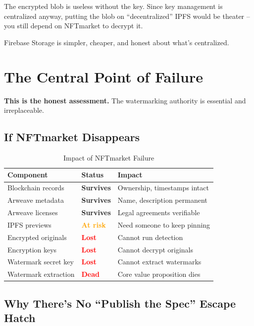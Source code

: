 \documentclass[11pt,a4paper]{article}
\begin{document}
The encrypted blob is useless without the key. Since key management is centralized anyway, putting the blob on ``decentralized'' IPFS would be theater -- you still depend on NFTmarket to decrypt it.

Firebase Storage is simpler, cheaper, and honest about what's centralized.

\newpage
\section{The Central Point of Failure}

\textbf{This is the honest assessment.} The watermarking authority is essential and irreplaceable.

\subsection{If NFTmarket Disappears}

\begin{table}[h]
\centering
\begin{tabular}{@{}L{4cm}L{2cm}L{6cm}@{}}
\toprule
\textbf{Component} & \textbf{Status} & \textbf{Impact} \\
\midrule
Blockchain records & \textcolor{green!60!black}{\textbf{Survives}} & Ownership, timestamps intact \\
Arweave metadata & \textcolor{green!60!black}{\textbf{Survives}} & Name, description permanent \\
Arweave licenses & \textcolor{green!60!black}{\textbf{Survives}} & Legal agreements verifiable \\
IPFS previews & \textcolor{orange}{\textbf{At risk}} & Need someone to keep pinning \\
Encrypted originals & \textcolor{red}{\textbf{Lost}} & Cannot run detection \\
Encryption keys & \textcolor{red}{\textbf{Lost}} & Cannot decrypt originals \\
Watermark secret key & \textcolor{red}{\textbf{Lost}} & Cannot extract watermarks \\
Watermark extraction & \textcolor{red}{\textbf{Dead}} & Core value proposition dies \\
\bottomrule
\end{tabular}
\caption{Impact of NFTmarket Failure}
\end{table}

\subsection{Why There's No ``Publish the Spec'' Escape Hatch}
\end{document}
